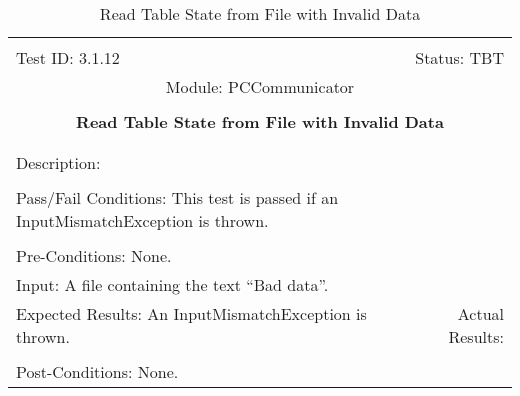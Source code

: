 \documentclass[titlepage]{article}
\begin{document}
\begin{center}%
\begin{table}
\begin{tabular}{|l r|}\hline&\\[-2mm]
	Test ID: 3.1.12	&Status: TBT\\[-3mm]
	\multicolumn{2}{|c|}{Module: PCCommunicator}\\&\\
	\multicolumn{2}{|c|}{\textbf{\large{Read Table State from File with Invalid Data}}}\\&\\\hline&\\[-3mm]
	\multicolumn{2}{|p{\textwidth}|}{Description: }\\[1mm]\hline&\\[-3mm]
	\multicolumn{2}{|p{\textwidth}|}{Pass/Fail Conditions: This test is passed if an InputMismatchException is thrown.}\\[1mm]\hline&\\[-3mm]
	\multicolumn{2}{|p{\textwidth}|}{Pre-Conditions: None.}\\[4mm]
	\multicolumn{2}{|p{\textwidth}|}{Input: A file containing the text ``Bad data''.}\\[2mm]\hline
	\multicolumn{1}{|p{0.49\textwidth}}{Expected Results: An InputMismatchException is thrown.}	&\multicolumn{1}{|p{0.45\textwidth}|}{Actual Results: }\\\hline&\\[-3mm]
	\multicolumn{2}{|p{\textwidth}|}{Post-Conditions: None.}\\\hline
\end{tabular}
\caption{Read Table State from File with Invalid Data}
\end{table}
\end{center}
\end{document}
